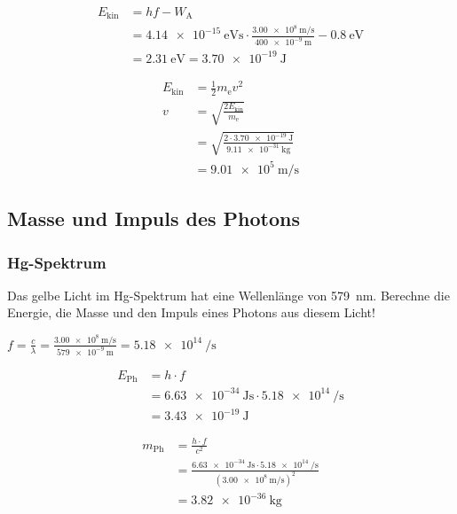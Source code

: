 \documentclass{ajc}
\begin{document}
	\begin{equation}
		\begin{split}
			E_\text{kin} &= hf - W_\text{A} \\
			&= \SI{4,14e-15}{\eV\s} \cdot \frac{\SI{3,00e8}{\m\per\s}}{\SI{400e-9}{\m}} - \SI{0,8}{\eV} \\
			&= \SI{2,31}{\eV} = \SI{3,70e-19}{\J}
		\end{split}
	\end{equation}
	
	\begin{equation}
		\begin{split}
			E_\text{kin} &= \frac{1}{2} m_\text{e}v^2 \\
			v &= \sqrt{\frac{2E_\text{kin}}{m_\text{e}}} \\
			  &= \sqrt{\frac{2 \cdot \SI{3,70e-19}{\J}}{\SI{9,11e-31}{\kg}}} \\
			  &= \SI{9,01e5}{\m\per\s}
		\end{split}
	\end{equation}
	
	\newpage
	
	\subsection{Masse und Impuls des Photons}
	
	\subsubsection{Hg-Spektrum}
	Das gelbe Licht im Hg-Spektrum hat eine Wellenlänge von \SI{579}{\nm}. Berechne die Energie, die Masse und den Impuls eines Photons aus diesem Licht!
	
	$f = \frac{c}{\lambda} = \frac{\SI{3,00e8}{\m\per\s}}{\SI{579e-9}{\m}} = \SI{5,18e14}{\per\s}$
	
	\begin{equation}
		\begin{split}
			E_\text{Ph} &= h \cdot f \\
						&= \SI{6,63e-34}{\J\s} \cdot \SI{5,18e14}{\per\s} \\
						&= \SI{3,43e-19}{\J}
		\end{split}
	\end{equation}
	
	\begin{equation}
		\begin{split}
			m_\text{Ph} &= \frac{h \cdot f}{c^2} \\
						&= \frac{\SI{6,63e-34}{\J\s} \cdot \SI{5,18e14}{\per\s}}{\left(\SI{3,00e8}{\m\per\s}\right)^2} \\
						&= \SI{3,82e-36}{\kg}
		\end{split}
	\end{equation}
	
\end{document}
